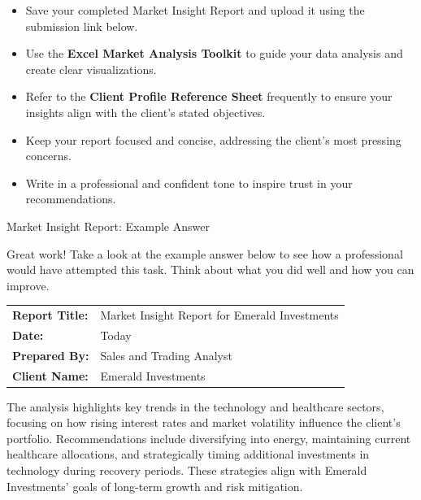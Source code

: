 \documentclass[11pt]{article}
\begin{document}
\begin{itemize}[leftmargin=1.5em, itemsep=2pt]
  \item Save your completed Market Insight Report and upload it using the
  submission link below.
\end{itemize}

\begin{itemize}[leftmargin=1.5em, itemsep=2pt]
  \item Use the \textbf{Excel Market Analysis Toolkit} to guide your data
  analysis and create clear visualizations.
  \item Refer to the \textbf{Client Profile Reference Sheet} frequently to
  ensure your insights align with the client's stated objectives.
  \item Keep your report focused and concise, addressing the client's most
  pressing concerns.
  \item Write in a professional and confident tone to inspire trust in your
  recommendations.
\end{itemize}

\medskip
{}


\newpage
{\fontsize{26}{30}\selectfont Market Insight Report: Example Answer}\par\bigskip

Great work! Take a look at the example answer below to see how a professional
would have attempted this task. Think about what you did well and how you can
improve.\par\bigskip

\begin{tabular}{@{}ll}
  \textbf{Report Title:} & Market Insight Report for Emerald Investments \\
  \textbf{Date:}         & Today \\
  \textbf{Prepared By:}  & Sales and Trading Analyst \\
  \textbf{Client Name:}  & Emerald Investments \\
\end{tabular}

The analysis highlights key trends in the technology and healthcare sectors,
focusing on how rising interest rates and market volatility influence the
client's portfolio. Recommendations include diversifying into energy,
maintaining current healthcare allocations, and strategically timing
additional investments in technology during recovery periods. These strategies
align with Emerald Investments' goals of long-term growth and risk mitigation.
\end{document}
